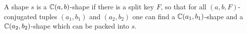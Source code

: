 \documentclass[a4paper,style=print,bibliography=totoc,nexus,lnum,extramargin]{tubsbook}
\begin{document}


%

\begin{theorem}\label{th:split-packing}


    A shape $s$ is a $\mathbb{C}(a,b)$-shape if there is a split key $F$, so that for all $(a,b,F)$-conjugated tuples $(a_1, b_1)$ and $(a_2, b_2)$ one can find a $\mathbb{C}(a_1, b_1)$-shape and a $\mathbb{C}(a_2, b_2)$-shape which can be packed into $s$.

\end{theorem}
\end{document}
